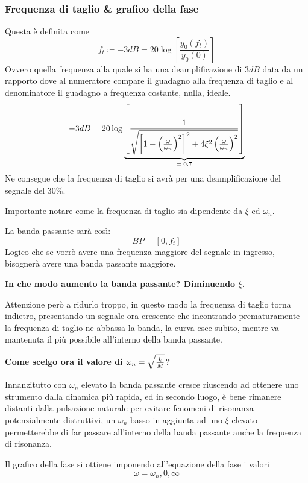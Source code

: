 \documentclass[a4paper, 15pt]{article}
\begin{document}
\subsubsection{Frequenza di taglio \& grafico della fase} 	
\begin{adjustwidth}{2in}{}
			Questa è definita come
			\[ f_t \coloneqq -3dB = 20\log\left[\dfrac{y_0(f_t)}{y_0(0)}\right]\]
			Ovvero quella frequenza alla quale si ha una deamplificazione di $3dB$ data da un rapporto dove al numeratore compare il guadagno alla frequenza di taglio e al denominatore il guadagno a frequenza costante, nulla, ideale. 
			\[  -3dB = 20\log\underbrace{\left[ \dfrac{1}{\sqrt{\left[1- \left(\omega\over\omega_n\right)^2\right]^2 + 4\xi^2\left(\omega\over\omega_n\right)^2}}\right]}_\text{$=0.7$}\]
			Ne consegue che la frequenza di taglio si avrà per una deamplificazione del segnale del $30\%$.
			
			Importante notare come la frequenza di taglio sia dipendente da $\xi$ ed $\omega_n$. \newline 
			
			La banda passante sarà così:
			\[BP = [0, f_t]\]
			Logico che se vorrò avere una frequenza maggiore del segnale in ingresso, bisognerà avere una banda passante maggiore.\newline
			
			\textbf{In che modo aumento la banda passante? Diminuendo $\xi$.}
			
			Attenzione però a ridurlo troppo, in questo modo la frequenza di taglio torna indietro, presentando un segnale ora crescente che incontrando prematuramente la frequenza di taglio ne abbassa la banda, la curva esce subito, mentre va mantenuta il più possibile all'interno della banda passante. \newline 
			
			\textbf{Come scelgo ora il valore di $\omega_n = \sqrt{k\over M}$?}
			
			Innanzitutto con $\omega_n$ elevato la banda passante cresce riuscendo ad ottenere uno strumento dalla dinamica più rapida, ed in secondo luogo, è bene rimanere distanti dalla pulsazione naturale per evitare fenomeni di risonanza potenzialmente distruttivi, un $\omega_n$ basso in aggiunta ad uno $\xi$ elevato permetterebbe di far passare all'interno della banda passante anche la frequenza di risonanza. \newline 
			
			Il grafico della fase si ottiene imponendo all'equazione della fase i valori \[\omega = \omega_n, 0, \infty\]
			

\end{adjustwidth}
\end{document}
